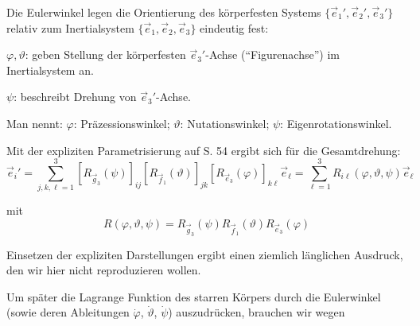 \documentclass[10pt, letterpaper]{article}
\begin{document}
\begin{figure}[h]
\centering
{}
\end{figure}

Die Eulerwinkel legen die Orientierung des körperfesten Systems $\{\vec{e}_1', \vec{e}_2', \vec{e}_3'\}$ relativ zum Inertialsystem $\{\vec{e}_1, \vec{e}_2, \vec{e}_3\}$ eindeutig fest:

$\varphi,\vartheta$: geben Stellung der körperfesten $\vec{e}_3'$-Achse (``Figurenachse'') im Inertialsystem an.

$\psi$: beschreibt Drehung von $\vec{e}_3'$-Achse.

Man nennt: \quad $\varphi$: Präzessionswinkel; $\vartheta$: Nutationswinkel; $\psi$: Eigenrotationswinkel.

Mit der expliziten Parametrisierung auf S. 54 ergibt sich für die Gesamtdrehung:
\[\vec{e}_i' = \sum_{j,k,\ell=1}^3 [R_{\vec{g}_3}(\psi)]_{ij} [R_{\vec{f}_1}(\vartheta)]_{jk} [R_{\vec{e}_3}(\varphi)]_{k\ell} \vec{e}_\ell = \sum_{\ell=1}^3 R_{i\ell}(\varphi,\vartheta,\psi)\vec{e}_\ell\]

mit 
\[R(\varphi,\vartheta,\psi) = R_{\vec{g}_3}(\psi) R_{\vec{f}_1}(\vartheta) R_{\vec{e}_3}(\varphi)\]

Einsetzen der expliziten Darstellungen ergibt einen ziemlich länglichen Ausdruck, den wir hier nicht reproduzieren wollen.

Um später die Lagrange Funktion des starren Körpers durch die Eulerwinkel (sowie deren Ableitungen $\dot{\varphi}$, $\dot{\vartheta}$, $\dot{\psi}$) auszudrücken, brauchen wir wegen
\end{document}
